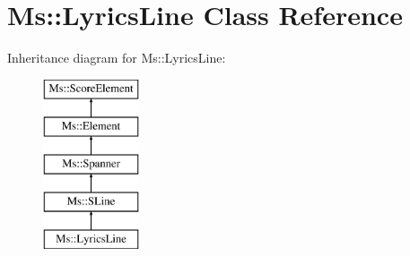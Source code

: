 \hypertarget{class_ms_1_1_lyrics_line}{}\section{Ms\+:\+:Lyrics\+Line Class Reference}
\label{class_ms_1_1_lyrics_line}
Inheritance diagram for Ms\+:\+:Lyrics\+Line\+:\begin{figure}[H]
\begin{center}
\leavevmode
\includegraphics[height=5.000000cm]{class_ms_1_1_lyrics_line}
\end{center}
\end{figure}
